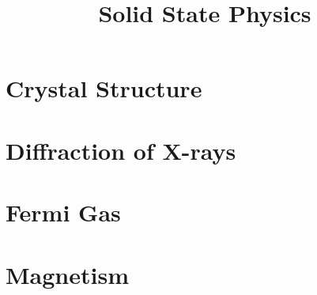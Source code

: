 \documentclass[11pt,a4paper]{book}
\title{Solid State Physics}
\begin{document}
\maketitle
\chapter{Crystal Structure}

\chapter{Diffraction of X-rays}

\chapter{Fermi Gas}

\chapter{Magnetism}

\end{document}
